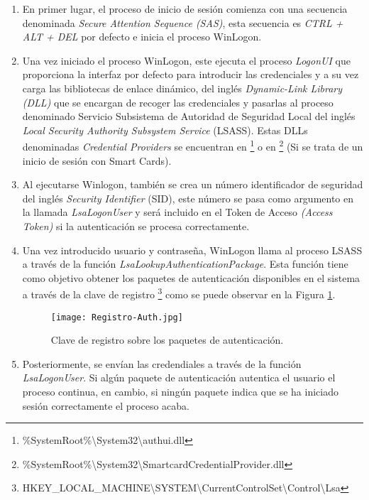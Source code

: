 \begin{enumerate}
\item En primer lugar, el proceso de inicio de sesión comienza con una secuencia denominada {\it Secure Attention Sequence (SAS)}, esta secuencia es {\it CTRL + ALT + DEL} por defecto e inicia el proceso WinLogon.
\item Una vez iniciado el proceso WinLogon, este ejecuta el proceso {\it LogonUI} que proporciona la interfaz por defecto para introducir las credenciales y a su vez carga las bibliotecas de enlace dinámico, del inglés {\it Dynamic-Link Library (DLL)} que se encargan de recoger las credenciales y pasarlas al proceso denominado Servicio Subsistema de Autoridad de Seguridad Local del inglés {\it Local Security Authority Subsystem Service} (LSASS). Estas DLLs denominadas {\it Credential Providers} se encuentran en \footnote{\%SystemRoot\%\textbackslash{}System32\textbackslash{}authui.dll} o en \footnote{\%SystemRoot\%\textbackslash{}System32\textbackslash{}SmartcardCredentialProvider.dll} (Si se trata de un inicio de sesión con Smart Cards).
\item Al ejecutarse Winlogon, también se crea un número identificador de seguridad del inglés {\it Security Identifier} (SID), este número se pasa como argumento en la llamada {\it LsaLogonUser} y será incluido en el Token de Acceso {\it (Access Token)} si la autenticación se procesa correctamente. 
\item Una vez introducido usuario y contraseña, WinLogon llama al proceso LSASS a través de la función {\it LsaLookupAuthenticationPackage}. Esta función tiene como objetivo obtener los paquetes de autenticación disponibles en el sistema a través de la clave de registro \footnote{HKEY\_LOCAL\_MACHINE\textbackslash{}SYSTEM\textbackslash{}CurrentControlSet\textbackslash{}Control\textbackslash{}Lsa} como se puede observar en la Figura \ref{Registro-Auth}.

\begin{figure}[t!] %
\begin{center}
\texttt{[image: Registro-Auth.jpg]}
\end{center}
\caption{Clave de registro sobre los paquetes de autenticación.}
\label{Registro-Auth}
\end{figure}

\item Posteriormente, se envían las credendiales a través de la función {\it LsaLogonUser}. Si algún paquete de autenticación autentica el usuario el proceso continua, en cambio, si ningún paquete indica que se ha iniciado sesión correctamente el proceso acaba.


\end{enumerate}
